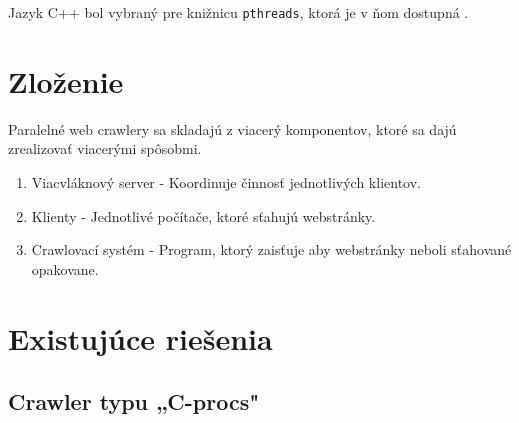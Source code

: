 \documentclass[10pt,twoside,slovak,a4paper]{article}
\begin{document}
Jazyk C++ bol vybraný pre knižnicu \texttt{pthreads}, ktorá je v ňom dostupná \cite{9648837}. 

\section{Zloženie}

Paralelné web crawlery sa skladajú z viacerý komponentov, ktoré sa dajú zrealizovať viacerými spôsobmi. \cite{9645918} \cite{kausar2013web} %

\begin{enumerate}
	\item Viacvláknový server - Koordinuje činnosť jednotlivých klientov.
	\item Klienty - Jednotlivé počítače, ktoré sťahujú webstránky.
	\item Crawlovací systém - Program, ktorý zaisťuje aby webstránky neboli sťahované opakovane.
\end{enumerate}

\section{Existujúce riešenia}
	\subsection{Crawler typu „C-procs" \cite{sharma2011novel}} %

\newpage

\nocite{*}


\end{document}
